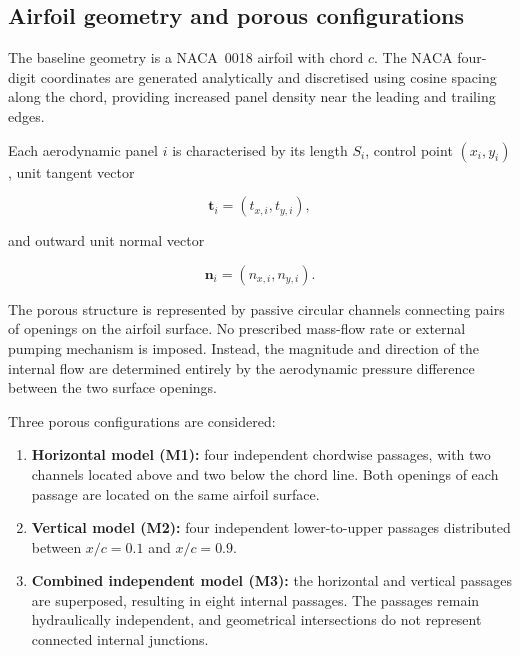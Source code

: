 \documentclass[a4paper,fleqn]{cas-dc}
\begin{document}

\subsection{Airfoil geometry and porous configurations}
\label{subsec:airfoil_porous_geometry}

The baseline geometry is a NACA~0018 airfoil with chord $c$. The
NACA four-digit coordinates are generated analytically and discretised
using cosine spacing along the chord, providing increased panel density
near the leading and trailing edges.

Each aerodynamic panel $i$ is characterised by its length $S_i$,
control point $(x_i,y_i)$, unit tangent vector

\begin{equation}
	\boldsymbol{t}_i
	=
	(t_{x,i},t_{y,i}),
\end{equation}

and outward unit normal vector

\begin{equation}
	\boldsymbol{n}_i
	=
	(n_{x,i},n_{y,i}).
\end{equation}

The porous structure is represented by passive circular channels
connecting pairs of openings on the airfoil surface. No prescribed
mass-flow rate or external pumping mechanism is imposed. Instead, the
magnitude and direction of the internal flow are determined entirely
by the aerodynamic pressure difference between the two surface
openings.

Three porous configurations are considered:

\begin{enumerate}
	
	\item \textbf{Horizontal model (M1):}
	four independent chordwise passages, with two channels located above
	and two below the chord line. Both openings of each passage are
	located on the same airfoil surface.
	
	\item \textbf{Vertical model (M2):}
	four independent lower-to-upper passages distributed between
	$x/c=0.1$ and $x/c=0.9$.
	
	\item \textbf{Combined independent model (M3):}
	the horizontal and vertical passages are superposed, resulting in
	eight internal passages. The passages remain hydraulically
	independent, and geometrical intersections do not represent
	connected internal junctions.
	
\end{enumerate}
\end{document}

